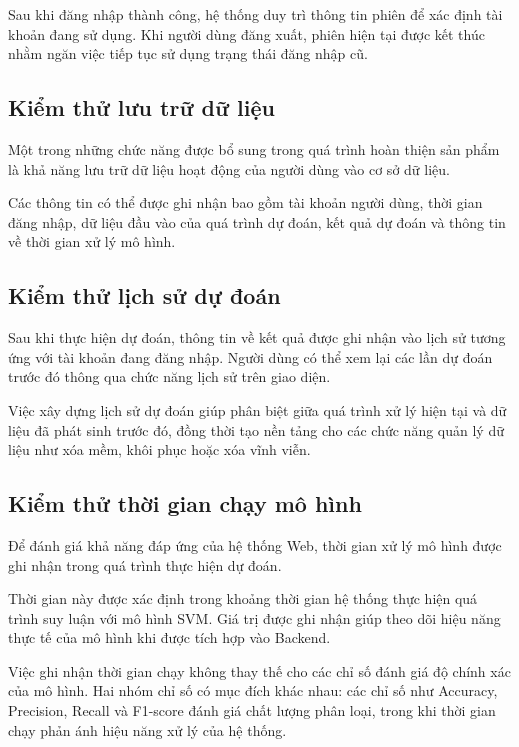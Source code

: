 \documentclass[14pt]{extarticle}
\begin{document}
	\noindent Sau khi đăng nhập thành công, hệ thống duy trì thông tin phiên để xác định tài khoản đang sử dụng. Khi người dùng đăng xuất, phiên hiện tại được kết thúc nhằm ngăn việc tiếp tục sử dụng trạng thái đăng nhập cũ.
	
	\subsection{Kiểm thử lưu trữ dữ liệu}
	
	\noindent Một trong những chức năng được bổ sung trong quá trình hoàn thiện sản phẩm là khả năng lưu trữ dữ liệu hoạt động của người dùng vào cơ sở dữ liệu.
	
	\noindent Các thông tin có thể được ghi nhận bao gồm tài khoản người dùng, thời gian đăng nhập, dữ liệu đầu vào của quá trình dự đoán, kết quả dự đoán và thông tin về thời gian xử lý mô hình.
	
	\subsection{Kiểm thử lịch sử dự đoán}
	
	\noindent Sau khi thực hiện dự đoán, thông tin về kết quả được ghi nhận vào lịch sử tương ứng với tài khoản đang đăng nhập. Người dùng có thể xem lại các lần dự đoán trước đó thông qua chức năng lịch sử trên giao diện.
	
	\noindent Việc xây dựng lịch sử dự đoán giúp phân biệt giữa quá trình xử lý hiện tại và dữ liệu đã phát sinh trước đó, đồng thời tạo nền tảng cho các chức năng quản lý dữ liệu như xóa mềm, khôi phục hoặc xóa vĩnh viễn.
	
	\subsection{Kiểm thử thời gian chạy mô hình}
	
	\noindent Để đánh giá khả năng đáp ứng của hệ thống Web, thời gian xử lý mô hình được ghi nhận trong quá trình thực hiện dự đoán.
	
	\noindent Thời gian này được xác định trong khoảng thời gian hệ thống thực hiện quá trình suy luận với mô hình SVM. Giá trị được ghi nhận giúp theo dõi hiệu năng thực tế của mô hình khi được tích hợp vào Backend.
	
	\noindent Việc ghi nhận thời gian chạy không thay thế cho các chỉ số đánh giá độ chính xác của mô hình. Hai nhóm chỉ số có mục đích khác nhau: các chỉ số như Accuracy, Precision, Recall và F1-score đánh giá chất lượng phân loại, trong khi thời gian chạy phản ánh hiệu năng xử lý của hệ thống.
	
\end{document}
